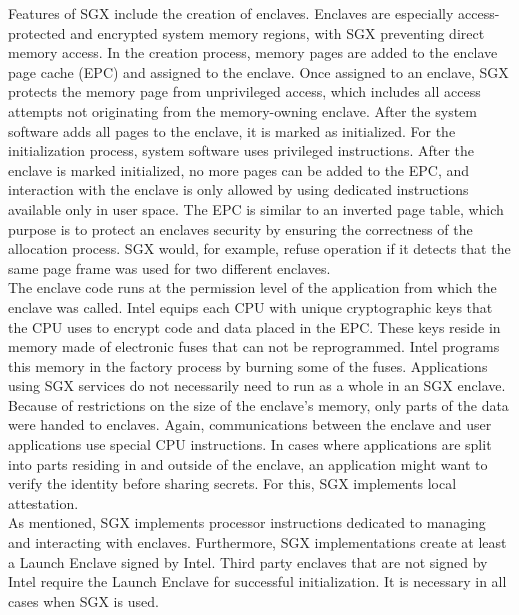 Features of SGX include the creation of enclaves. Enclaves are especially
access-protected and encrypted system memory regions, with SGX preventing direct
memory access. In the creation process, memory pages are added to the enclave
page cache (EPC) and assigned to the enclave. Once assigned to an enclave, SGX
protects the memory page from unprivileged access, which includes all access
attempts not originating from the memory-owning enclave. After the system
software adds all pages to the enclave, it is marked as initialized. For the
initialization process, system software uses privileged instructions. After the
enclave is marked initialized, no more pages can be added to the EPC, and
interaction with the enclave is only allowed by using dedicated instructions
available only in user space. The EPC is similar to an inverted page table,
which purpose is to protect an enclaves security by ensuring the correctness of
the allocation process. SGX would, for example, refuse operation if it detects
that the same page frame was used for two different enclaves.\\

The enclave code runs at the permission level of
the application from which the enclave was called. Intel equips each CPU with
unique cryptographic keys that the CPU uses to encrypt code and data placed in
the EPC. These keys reside in memory made of electronic fuses that can not be
reprogrammed. Intel programs this memory in the factory process by burning some
of the fuses. Applications using SGX services do not necessarily need to run as
a whole in an SGX enclave. Because of restrictions on the size of the enclave's
memory, only parts of the data were handed to enclaves. Again, communications
between the enclave and user applications use special CPU instructions. In cases
where applications are split into parts residing in and outside of the enclave,
an application might want to verify the identity before sharing secrets. For
this, SGX implements local attestation.\\

As mentioned, SGX implements processor instructions dedicated to managing and
interacting with enclaves. Furthermore, SGX implementations create at least a
Launch Enclave signed by Intel. Third party enclaves that are not signed by
Intel require the Launch Enclave for successful initialization. It is necessary
in all cases when SGX is used.\\

